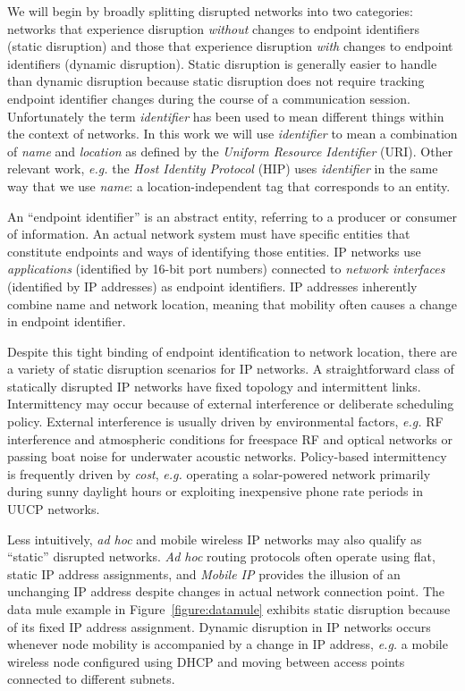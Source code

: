 \documentclass[10pt,letterpaper]{article}
\begin{document}
We will begin by broadly splitting disrupted networks into two categories:
networks that experience disruption {\em without} changes to endpoint
identifiers (static disruption) and those that experience disruption
{\em with} changes to endpoint identifiers (dynamic disruption). Static
disruption is generally easier to handle than dynamic disruption because
static disruption does not require tracking endpoint identifier changes
during the course of a communication session. Unfortunately the
term {\em identifier} has been used to mean different things within
the context of networks. In this work we will use {\em identifier} to
mean a combination of {\em name} and {\em location} as
defined by the {\em Uniform Resource Identifier}\cite{3986:rfc} (URI).
Other relevant work, {\em e.g.} the {\em Host Identity Protocol}
\cite{4423:rfc} (HIP) uses {\em identifier} in the same way that
we use {\em name}: a location-independent tag that corresponds to an entity.

An ``endpoint identifier'' is an abstract entity, referring to a producer
or consumer of information. An actual network system must have specific
entities that constitute endpoints and ways of identifying those entities.
IP networks use  {\em applications} (identified by 16-bit port numbers)
connected to {\em network interfaces} (identified by IP addresses) as endpoint
identifiers. IP addresses inherently combine name and network location,
meaning that mobility often causes a change in endpoint identifier.

Despite this tight binding of endpoint identification to network
location, there are a variety of static disruption scenarios
for IP networks. A straightforward class of statically disrupted
IP networks have fixed topology and intermittent
links. Intermittency may occur because of external
interference or deliberate scheduling policy. External interference
is usually driven by environmental factors, {\em e.g.} RF interference
and atmospheric conditions for freespace RF and optical networks or
passing boat noise for underwater acoustic networks.
Policy-based intermittency is frequently driven by {\em cost},
{\em e.g.} operating a solar-powered network primarily
during sunny daylight hours or exploiting inexpensive phone rate periods
in UUCP networks.

Less intuitively, {\em ad hoc} and mobile wireless IP networks may also
qualify as ``static'' disrupted networks.
{\em Ad hoc} routing protocols often operate using 
flat, static IP address assignments, and {\em Mobile IP}\cite{mobileip:rfc}
provides the illusion of an unchanging IP address despite changes
in actual network connection point. The data mule example in
Figure~\ref{figure:datamule} exhibits static disruption because of its
fixed IP address assignment. Dynamic disruption in IP networks occurs
whenever node mobility is accompanied by a change in IP address, {\em e.g.}
a mobile wireless node configured using DHCP and moving between
access points connected to different subnets.
\end{document}
